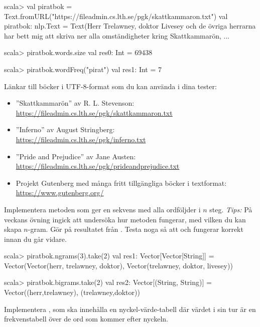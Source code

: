 \begin{REPL}[basicstyle=\color{white}\ttfamily\fontsize{9}{11}\selectfont]
scala> val piratbok = Text.fromURL("https://fileadmin.cs.lth.se/pgk/skattkammaron.txt")
val piratbok: nlp.Text = Text(Herr Trelawney, doktor Livesey och de övriga herrarna har bett mig att skriva ner alla omständigheter kring Skattkammarön, ...

scala> piratbok.words.size
val res0: Int = 69438

scala> piratbok.wordFreq("pirat")
val res1: Int = 7
\end{REPL}
Länkar till böcker i UTF-8-format som du kan använda i dina tester:
\begin{itemize}%
\item ''Skattkammarön'' av R. L. Stevenson: \\\url{https://fileadmin.cs.lth.se/pgk/skattkammaron.txt}
\item ''Inferno'' av August Stringberg: \\\url{https://fileadmin.cs.lth.se/pgk/inferno.txt}
\item ''Pride and Prejudice'' av Jane Austen: \\\url{https://fileadmin.cs.lth.se/pgk/prideandprejudice.txt}
\item Projekt Gutenberg med många fritt tillgängliga böcker i textformat: \\\url{https://www.gutenberg.org/}
\end{itemize}






\Task Implementera metoden  som ger en sekvens med alla ordföljder i $n$ steg. \emph{Tips:} På veckans övning ingick att undersöka hur metoden  fungerar, med vilken du kan skapa $n$-gram. Gör  på resultatet från . Testa noga så att  och  fungerar korrekt innan du går vidare.
\begin{REPL}
scala> piratbok.ngrams(3).take(2)
val res1: Vector[Vector[String]] =
  Vector(Vector(herr, trelawney, doktor), Vector(trelawney, doktor, livesey))

scala> piratbok.bigrams.take(2)
val res2: Vector[(String, String)] =
  Vector((herr,trelawney), (trelawney,doktor))
\end{REPL}

\Task Implementera , som ska innehålla en nyckel-värde-tabell där värdet i sin tur är en frekvenstabell över de ord som kommer efter nyckeln. \label{task-follow-freq}

